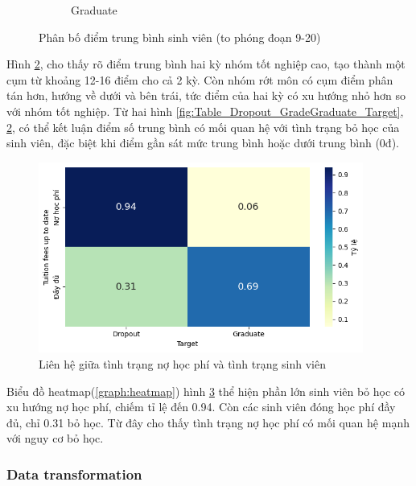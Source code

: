 \begin{figure}[htp]
\begin{subfigure}{0.45\textwidth}
            \caption{Graduate}
            \label{fig:Table_Dropout_GradeGraduate_Target_ZoomIn}
        \end{subfigure}
        \caption{Phân bố điểm trung bình sinh viên (to phóng đoạn 9-20)}
        \label{fig:Table_Dropout_GradeGraduate_Target_ZoomIn}
    \end{figure}

    \FloatBarrier

    Hình \ref{fig:Table_Dropout_GradeGraduate_Target_ZoomIn}, cho thấy rõ điểm trung bình hai kỳ nhóm tốt nghiệp cao, tạo thành một cụm từ khoảng 12-16 điểm cho cả 2 kỳ. Còn nhóm rớt môn có cụm điểm phân tán hơn, hướng về dưới và bên trái, tức điểm của hai kỳ có xu hướng nhỏ hơn so với nhóm tốt nghiệp. Từ hai hình \ref{fig:Table_Dropout_GradeGraduate_Target}, \ref{fig:Table_Dropout_GradeGraduate_Target_ZoomIn}, có thể kết luận điểm số trung bình có mối quan hệ với tình trạng bỏ học của sinh viên, đặc biệt khi điểm gần sát mức trung bình hoặc dưới trung bình (0đ).

    \begin{figure}[htp]
        \centering
        \includegraphics[width=0.95\textwidth]{images/Table_Dropout_Fee_Target.png}
        \caption{Liên hệ giữa tình trạng nợ học phí và tình trạng sinh viên}
        \label{fig:Table_Dropout_Fee_Target}
    \end{figure}

    \FloatBarrier

    Biểu đồ heatmap(\ref{graph:heatmap}) hình \ref{fig:Table_Dropout_Fee_Target} thể hiện phần lớn sinh viên bỏ học có xu hướng nợ học phí, chiếm tỉ lệ đến 0.94. Còn các sinh viên đóng học phí đầy đủ, chỉ 0.31 bỏ học. Từ đây cho thấy tình trạng nợ học phí có mối quan hệ mạnh với nguy cơ bỏ học.


\subsubsection{Data transformation}

